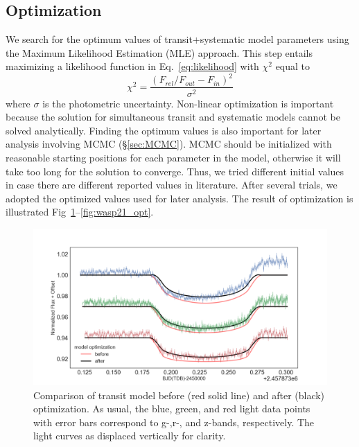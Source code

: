 \subsection{Optimization\label{sec:optimization}}
We search for the optimum values of transit+systematic model parameters using the Maximum Likelihood Estimation (MLE) approach. This step entails maximizing a likelihood function in Eq.~\ref{eq:likelihood} with $\chi^2$ equal to 
\begin{equation}
\chi^2=\frac{(F_{rel}/F_{out}-F_{in})^2}{\sigma^2}
\end{equation}
where $\sigma$ is the %
photometric uncertainty. 
Non-linear optimization is important because the solution for simultaneous transit and systematic models cannot be solved analytically. Finding the optimum values is also important for later analysis involving MCMC (\S \ref{sec:MCMC}). MCMC should be initialized with reasonable starting positions for each parameter in the model, otherwise it will take too long for the solution to converge. Thus, we tried different initial values in case there are different reported values in literature. After several trials, we adopted the optimized values used for later analysis. The result of optimization is illustrated Fig~\ref{fig:hatp44_opt}--\ref{fig:wasp21_opt}. 

\begin{figure}
\centering
\includegraphics[width=12cm]{hatp44/optimized_transit_model.png}
\caption{Comparison of transit model before (red solid line) and after (black) optimization. As usual, the blue, green, and red light data points with error bars correspond to g-,r-, and z-bands, respectively. The light curves as displaced vertically for clarity.}
\label{fig:hatp44_opt}
\end{figure}

